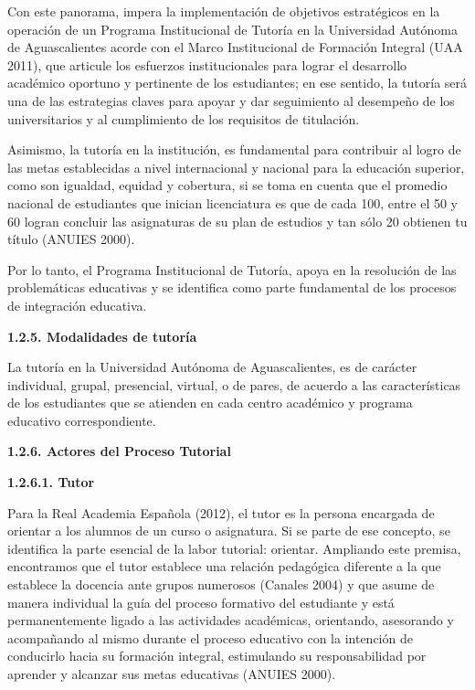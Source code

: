 Con este panorama, impera la implementación de objetivos estratégicos en la
operación de un Programa Institucional de Tutoría en la Universidad
Autónoma de Aguascalientes acorde con el Marco Institucional de Formación
Integral (UAA 2011), que articule los esfuerzos institucionales para lograr
el desarrollo académico oportuno y pertinente de los estudiantes; en ese
sentido, la tutoría será una de las estrategias claves para apoyar y dar
seguimiento al desempeño de los universitarios y al cumplimiento de los
requisitos de titulación.

Asimismo, la tutoría en la institución, es fundamental para contribuir al
logro de las metas establecidas a nivel internacional y nacional para la
educación superior, como son igualdad, equidad y cobertura, si se toma en
cuenta que el promedio nacional de estudiantes que inician licenciatura es
que de cada 100, entre el 50 y 60 logran concluir las asignaturas de su
plan de estudios y tan sólo 20 obtienen tu título (ANUIES 2000).

Por lo tanto, el Programa Institucional de Tutoría, apoya en la resolución
de las problemáticas educativas y se identifica como parte fundamental de
los procesos de integración educativa.


\medskip
{\bfseries 1.2.5. Modalidades de tutoría}

La tutoría en la Universidad Autónoma de Aguascalientes, es de carácter
individual, grupal, presencial, virtual, o de pares, de acuerdo a las
características de los estudiantes que se atienden en cada centro académico
y programa educativo correspondiente.


\medskip
{\bfseries 1.2.6. Actores del Proceso Tutorial}

\medskip
{\bfseries 1.2.6.1. Tutor}
\enlargethispage{-1\baselineskip}

Para la Real Academia Española (2012), el tutor es la persona encargada de
orientar a los alumnos de un curso o asignatura. Si se parte de ese
concepto, se identifica la parte esencial de la labor tutorial: orientar.
Ampliando este premisa, encontramos que el tutor establece una relación
pedagógica diferente a la que establece la docencia ante grupos numerosos
(Canales 2004) y que asume de manera individual la guía del proceso
formativo del estudiante y está permanentemente ligado a las actividades
académicas, orientando, asesorando y acompañando al mismo durante el
proceso educativo con la intención de conducirlo hacia su formación
integral, estimulando su responsabilidad por aprender y alcanzar sus metas
educativas (ANUIES 2000).

